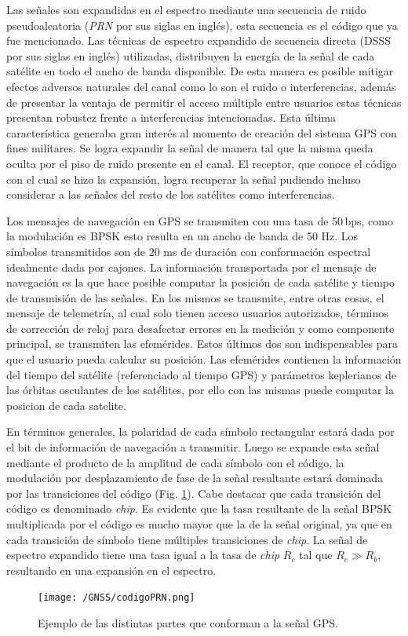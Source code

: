 \documentclass[a4paper,12pt,oneside,onecolumn,final,openright]{book}%
\begin{document}
	Las señales son expandidas en el espectro mediante una secuencia de ruido pseudoaleatoria (\textit{PRN} por sus siglas en inglés), esta secuencia es el código que ya fue mencionado. Las técnicas de espectro expandido de secuencia directa (DSSS por sus siglas en inglés) utilizadas, distribuyen la energía de la señal de cada satélite en todo el ancho de banda disponible. De esta manera es posible mitigar efectos adversos naturales del canal como lo son el ruido o interferencias, además de presentar la ventaja de permitir el acceso múltiple entre usuarios estas técnicas presentan robustez frente a interferencias intencionadas. Esta última característica generaba gran interés al momento de creación del sistema GPS con fines militares. Se logra expandir la señal de manera tal que la misma queda oculta por el piso de ruido presente en el canal. El receptor, que conoce el código con el cual se hizo la expansión, logra recuperar la señal pudiendo incluso considerar a las señales del resto de los satélites como interferencias. 
	
	Los mensajes de navegación en GPS se transmiten con una tasa de 50\,bps, como la modulación es BPSK esto resulta en un ancho de banda de 50 Hz. Los símbolos transmitidos son de 20 ms de duración con conformación espectral idealmente dada por cajones. La información transportada por el mensaje de navegación es la que hace posible computar la posición de cada satélite y tiempo de transmisión de las señales. En los mismos se transmite, entre otras cosas, el mensaje de telemetría, al cual solo tienen acceso usuarios autorizados, términos de corrección de reloj para desafectar errores en la medición y como componente principal, se transmiten las efemérides. Estos últimos dos son indispensables para que el usuario pueda calcular su posición. Las efemérides contienen la información del tiempo del satélite (referenciado al tiempo GPS) y parámetros keplerianos de las órbitas osculantes de los satélites, por ello con las mismas puede computar la posicion de cada satelite.
	
	En términos generales, la polaridad de cada símbolo rectangular estará dada por el bit de información de navegación a transmitir. Luego se expande esta señal mediante el producto de la amplitud de cada símbolo con el código, la modulación por desplazamiento de fase de la señal resultante estará dominada por las transiciones del código (Fig. \ref{fig:PRN}). Cabe destacar que cada transición del código es denominado \textit{chip}. Es evidente que la tasa resultante de la señal BPSK multiplicada por el código es mucho mayor que la de la señal original, ya que en cada transición de símbolo tiene múltiples transiciones de \textit{chip}. La señal de espectro expandido tiene una tasa igual a la tasa de \textit{chip} $R_c$ tal que $R_c \gg R_b$, resultando en una expansión en el espectro.
\begin{figure}%
    \centering
    \texttt{[image: /GNSS/codigoPRN.png]}
    \caption{Ejemplo de las distintas partes que conforman a la señal GPS.}
    \label{fig:PRN}
\end{figure}
\end{document}
